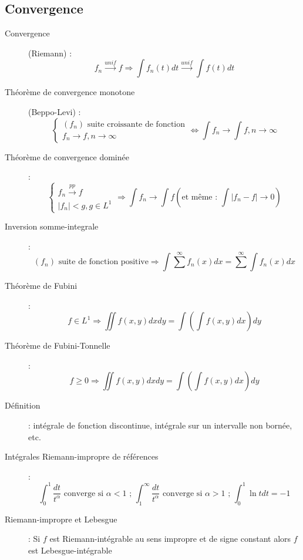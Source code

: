 \subsection{Convergence}
\begin{description}
\item[Convergence] (Riemann) : 
    \[ f_n\overset{unif}\longrightarrow f
    \Rightarrow
    \int f_n(t)dt \overset{unif}\longrightarrow \int f(t)dt \]
\item[Théorème de convergence monotone] (Beppo-Levi) : 
    \[
        \begin{cases}
            (f_n)\textrm{ suite croissante de fonction}\\
            f_n\longrightarrow f, n\longrightarrow\infty
        \end{cases}
        \Leftrightarrow
        \int f_n\longrightarrow\int f, n\longrightarrow\infty
    \]
\item[Théorème de convergence dominée] : 
    \[
        \begin{cases}
            f_n\overset{pp}{\longrightarrow}f\\
            |f_n|< g, g\in L^1
        \end{cases}
        \Rightarrow
        \int f_n\longrightarrow\int f 
        \left(
        \textrm{et même : }
        \int|f_n-f|\longrightarrow 0    
        \right)
    \]
\item[Inversion somme-integrale] : 
    \[
        (f_n) \textrm{ suite de fonction positive}
        \Rightarrow
        \int\sum^\infty f_n(x)dx=\sum^\infty\int f_n(x)dx
    \]
\item[Théorème de Fubini] : 
    \[
        f\in L^1\Rightarrow
        \iint f(x,y)dxdy=\int\left(\int f(x,y)dx\right)dy
    \]
\item[Théorème de Fubini-Tonnelle] : 
    \[
        f\ge 0\Rightarrow
        \iint f(x,y)dxdy=\int\left(\int f(x,y)dx\right)dy
    \]
\item[Définition] : intégrale de fonction discontinue, intégrale sur un intervalle non bornée, etc.
\item[Intégrales Riemann-impropre de références] :
    \[
        \int_0^1\frac{dt}{t^\alpha}\textrm{ converge si }\alpha <1
        \textrm{ ; }
        \int_1^\infty\frac{dt}{t^\alpha}\textrm{ converge si }\alpha >1
        \textrm{ ; }
        \int_0^1\ln tdt=-1
    \]
\item[Riemann-impropre et Lebesgue] : Si $f$ est Riemann-intégrable au sens impropre et de signe constant alors $f$ est
Lebesgue-intégrable
\end{description}
